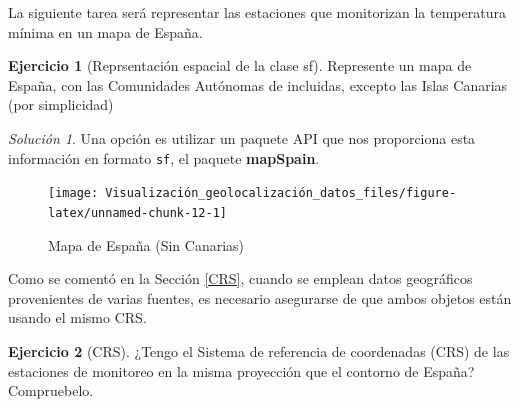 \documentclass[
]{report}
\newenvironment{Shaded}{\begin{snugshade}}{\end{snugshade}}
\newcommand{\CommentTok}[1]{\textcolor[rgb]{0.56,0.35,0.01}{\textit{#1}}}
\newcommand{\FunctionTok}[1]{\textcolor[rgb]{0.00,0.00,0.00}{#1}}
\newcommand{\NormalTok}[1]{#1}
\newcommand{\OtherTok}[1]{\textcolor[rgb]{0.56,0.35,0.01}{#1}}
\newcommand{\SpecialCharTok}[1]{\textcolor[rgb]{0.00,0.00,0.00}{#1}}
\newcommand{\StringTok}[1]{\textcolor[rgb]{0.31,0.60,0.02}{#1}}
\theoremstyle{definition}
\theoremstyle{definition}
\theoremstyle{definition}
\newtheorem{exercise}{Ejercicio}[chapter]
\theoremstyle{definition}
\theoremstyle{remark}
\newtheorem*{solution}{Solución}
\begin{document}
La siguiente tarea será representar las estaciones que monitorizan la
temperatura mínima en un mapa de España.

\begin{exercise}[Reprsentación espacial de la clase sf]
\protect\hypertarget{exr:ex6}{}\label{exr:ex6}Represente un mapa de España, con las Comunidades Autónomas de incluidas,
excepto las Islas Canarias (por simplicidad)
\end{exercise}

\begin{solution}
Una opción es utilizar un paquete API que nos proporciona esta información en
formato \texttt{sf}, el paquete \textbf{mapSpain}.
\end{solution}

\begin{Shaded}
\end{Shaded}

\begin{figure}

{\centering \texttt{[image: Visualización\_geolocalización\_datos\_files/figure-latex/unnamed-chunk-12-1]} 

}

\caption{Mapa de España (Sin Canarias)}\label{fig:unnamed-chunk-12}
\end{figure}

Como se comentó en la Sección \ref{CRS}, cuando se emplean datos geográficos
provenientes de varias fuentes, es necesario asegurarse de que ambos objetos
están usando el mismo CRS.

\begin{exercise}[CRS]
\protect\hypertarget{exr:ex7}{}\label{exr:ex7}¿Tengo el Sistema de referencia de coordenadas (CRS) de las estaciones de
monitoreo en la misma proyección que el contorno de España? Compruebelo.
\end{exercise}
\end{document}

